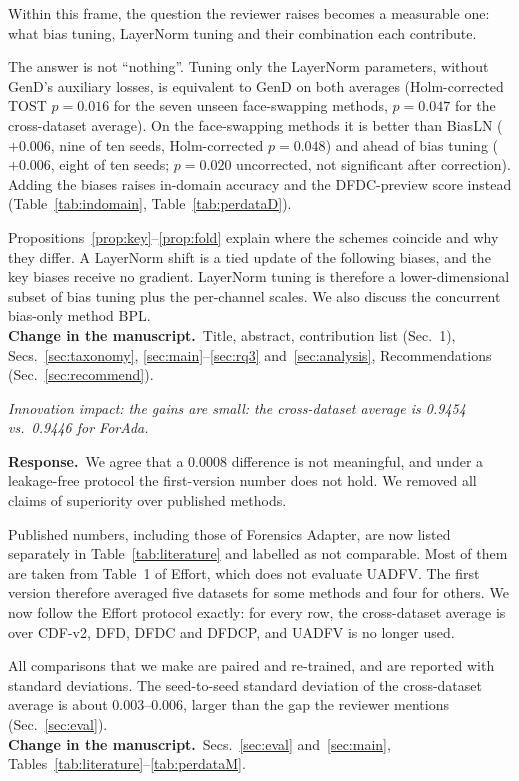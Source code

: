 \documentclass[11pt]{article}
\newenvironment{comment}{\par\medskip\noindent\begin{minipage}{\linewidth}\color{black!70}\itshape}{\end{minipage}\par\smallskip}
\newcommand{\resp}{\noindent\textbf{Response.}~}
\newcommand{\change}{\noindent\textbf{Change in the manuscript.}~}
\begin{document}
Within this frame, the question the reviewer raises becomes a measurable one: what bias tuning, LayerNorm tuning and their combination each contribute.

The answer is not ``nothing''. Tuning only the LayerNorm parameters, without GenD's auxiliary losses, is equivalent to GenD on both averages (Holm-corrected TOST $p=0.016$ for the seven unseen face-swapping methods, $p=0.047$ for the cross-dataset average). On the face-swapping methods it is better than BiasLN ($+0.006$, nine of ten seeds, Holm-corrected $p=0.048$) and ahead of bias tuning ($+0.006$, eight of ten seeds; $p=0.020$ uncorrected, not significant after correction). Adding the biases raises in-domain accuracy and the DFDC-preview score instead (Table~\ref{tab:indomain}, Table~\ref{tab:perdataD}).

Propositions~\ref{prop:key}--\ref{prop:fold} explain where the schemes coincide and why they differ. A LayerNorm shift is a tied update of the following biases, and the key biases receive no gradient. LayerNorm tuning is therefore a lower-dimensional subset of bias tuning plus the per-channel scales. We also discuss the concurrent bias-only method BPL.\\
\change Title, abstract, contribution list (Sec.~1), Secs.~\ref{sec:taxonomy}, \ref{sec:main}--\ref{sec:rq3} and~\ref{sec:analysis}, Recommendations (Sec.~\ref{sec:recommend}).

\begin{comment}
Innovation impact: the gains are small: the cross-dataset average is 0.9454 vs.\ 0.9446 for ForAda.
\end{comment}
\resp We agree that a 0.0008 difference is not meaningful, and under a leakage-free protocol the first-version number does not hold. We removed all claims of superiority over published methods.

Published numbers, including those of Forensics Adapter, are now listed separately in Table~\ref{tab:literature} and labelled as not comparable. Most of them are taken from Table~1 of Effort, which does not evaluate UADFV. The first version therefore averaged five datasets for some methods and four for others. We now follow the Effort protocol exactly: for every row, the cross-dataset average is over CDF-v2, DFD, DFDC and DFDCP, and UADFV is no longer used.

All comparisons that we make are paired and re-trained, and are reported with standard deviations. The seed-to-seed standard deviation of the cross-dataset average is about 0.003--0.006, larger than the gap the reviewer mentions (Sec.~\ref{sec:eval}).\\
\change Secs.~\ref{sec:eval} and~\ref{sec:main}, Tables~\ref{tab:literature}--\ref{tab:perdataM}.
\end{document}
